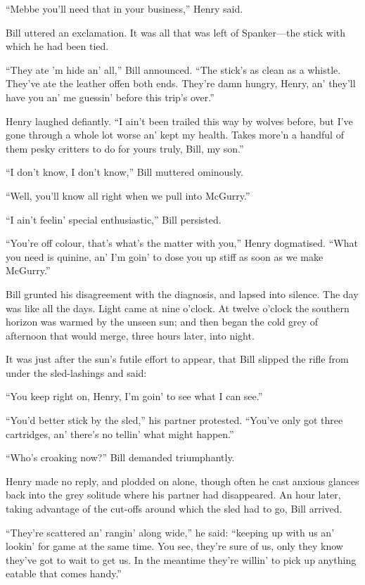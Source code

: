 \documentclass[10pt]{book}
\begin{document}
“Mebbe you’ll need that in your business,” Henry said.

Bill uttered an exclamation. It was all that was left of Spanker—the
stick with which he had been tied.

“They ate ’m hide an’ all,” Bill announced. “The stick’s as clean as a
whistle. They’ve ate the leather offen both ends. They’re damn hungry,
Henry, an’ they’ll have you an’ me guessin’ before this trip’s over.”

Henry laughed defiantly. “I ain’t been trailed this way by wolves
before, but I’ve gone through a whole lot worse an’ kept my health.
Takes more’n a handful of them pesky critters to do for yours truly,
Bill, my son.”

“I don’t know, I don’t know,” Bill muttered ominously.

“Well, you’ll know all right when we pull into McGurry.”

“I ain’t feelin’ special enthusiastic,” Bill persisted.

“You’re off colour, that’s what’s the matter with you,” Henry
dogmatised. “What you need is quinine, an’ I’m goin’ to dose you up
stiff as soon as we make McGurry.”

Bill grunted his disagreement with the diagnosis, and lapsed into
silence. The day was like all the days. Light came at nine o’clock. At
twelve o’clock the southern horizon was warmed by the unseen sun; and
then began the cold grey of afternoon that would merge, three hours
later, into night.

It was just after the sun’s futile effort to appear, that Bill slipped
the rifle from under the sled-lashings and said:

“You keep right on, Henry, I’m goin’ to see what I can see.”

“You’d better stick by the sled,” his partner protested. “You’ve only
got three cartridges, an’ there’s no tellin’ what might happen.”

“Who’s croaking now?” Bill demanded triumphantly.

Henry made no reply, and plodded on alone, though often he cast anxious
glances back into the grey solitude where his partner had disappeared.
An hour later, taking advantage of the cut-offs around which the sled
had to go, Bill arrived.

“They’re scattered an’ rangin’ along wide,” he said: “keeping up with
us an’ lookin’ for game at the same time. You see, they’re sure of us,
only they know they’ve got to wait to get us. In the meantime they’re
willin’ to pick up anything eatable that comes handy.”
\end{document}
